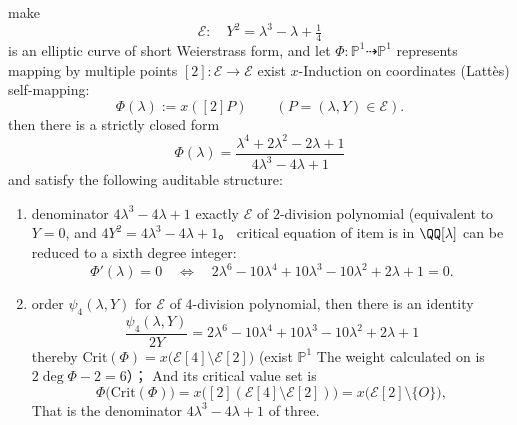 \begin{conclusion}\label{con:xi-terminal-zm-lattes-4division-certificate}
make
\[
\mathcal{E}:\quad Y^{2}=\lambda^{3}-\lambda+\tfrac14
\]
is an elliptic curve of short Weierstrass form, and let \(\Phi:\mathbb{P}^{1}\dashrightarrow\mathbb{P}^{1}\) represents mapping by multiple points \([2]:\mathcal{E}\to\mathcal{E}\) exist \(x\)-Induction on coordinates (Latt\`es) self-mapping:
\[
\Phi(\lambda):=x([2]P)\qquad(P=(\lambda,Y)\in\mathcal{E}).
\]
then there is a strictly closed form
\[
\boxed{\;
\Phi(\lambda)=\frac{\lambda^{4}+2\lambda^{2}-2\lambda+1}{4\lambda^{3}-4\lambda+1}\;}
\]
and satisfy the following auditable structure:
\begin{enumerate}
  \item denominator \(4\lambda^{3}-4\lambda+1\) exactly \(\mathcal{E}\) of \(2\)-division polynomial (equivalent to \(Y=0\), and
  \(
  4Y^{2}=4\lambda^{3}-4\lambda+1
  \)。
  \The critical equation of item is in \(\QQ[\lambda]\) can be reduced to a sixth degree integer:
  \[
  \Phi'(\lambda)=0\quad\Longleftrightarrow\quad
  2\lambda^{6}-10\lambda^{4}+10\lambda^{3}-10\lambda^{2}+2\lambda+1=0.
  \]
  \item order \(\psi_{4}(\lambda,Y)\) for \(\mathcal{E}\) of \(4\)-division polynomial, then there is an identity
  \[
  \boxed{\;
  \frac{\psi_{4}(\lambda,Y)}{2Y}
  =2\lambda^{6}-10\lambda^{4}+10\lambda^{3}-10\lambda^{2}+2\lambda+1\;}
  \]
  thereby
  \(
  \mathrm{Crit}(\Phi)=x\bigl(\mathcal{E}[4]\setminus\mathcal{E}[2]\bigr)
  \)
  (exist \(\mathbb{P}^{1}\) The weight calculated on is \(2\deg\Phi-2=6\)）；
  And its critical value set is
  \[
  \Phi\!\bigl(\mathrm{Crit}(\Phi)\bigr)
  =x\bigl([2](\mathcal{E}[4]\setminus\mathcal{E}[2])\bigr)
  =x\bigl(\mathcal{E}[2]\setminus\{O\}\bigr),
  \]
  That is the denominator \(4\lambda^{3}-4\lambda+1\) of three.
\end{enumerate}
\end{conclusion}
